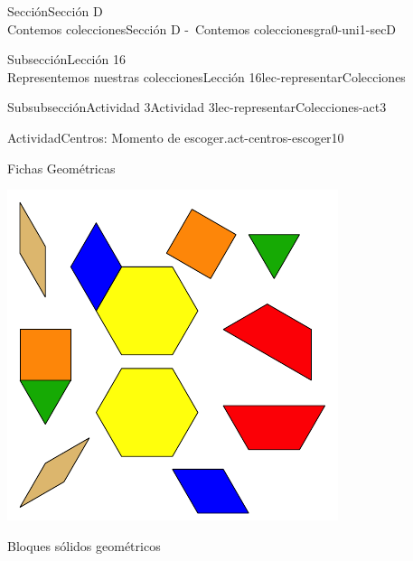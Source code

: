 \begin{sectionptx}{Sección}{{\Large Sección D\\}Contemos colecciones}{}{Sección D -~Contemos colecciones}{}{}{gra0-uni1-secD}
\begin{subsectionptx}{Subsección}{{\normalsize Lección 16\\[-0.05cm]}Representemos nuestras colecciones}{}{Lección 16}{}{}{lec-representarColecciones}
\begin{subsubsectionptx}{Subsubsección}{Actividad 3}{}{Actividad 3}{}{}{lec-representarColecciones-act3}
\begin{activity}{Actividad}{Centros: Momento de escoger.}{act-centros-escoger10}
\begin{sidebyside}{2}{0.025}{0.025}{0.05}
\begin{sbspanel}{0.45}
\end{sbspanel}%
\begin{sbspanel}{0.45}%
Fichas Geométricas%
\par
\includegraphics[max width=\linewidth, center]{external/svg-source/tikz-file-147344.pdf}
\end{sbspanel}%
\end{sidebyside}%
\begin{sidebyside}{2}{0.025}{0.025}{0.05}%
\begin{sbspanel}{0.45}%
Bloques sólidos geométricos%
\par

\end{sbspanel}
\end{sidebyside}
\end{activity}
\end{subsubsectionptx}
\end{subsectionptx}
\end{sectionptx}
